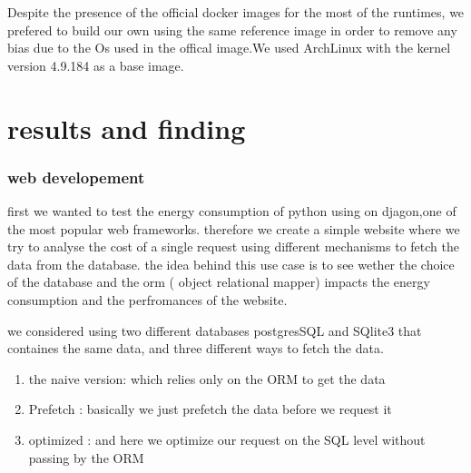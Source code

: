 Despite the presence of the official docker images for the most of the runtimes, we prefered to build our own using the same reference image in order to remove any bias due to the Os used in the offical image.We used ArchLinux with the kernel version 4.9.184 as a base image.
\section{results and finding}











\subsubsection{web developement}
first we wanted to test the energy consumption of python using on djagon,one of the most popular web frameworks.
therefore we create a simple website where we try to analyse the cost of a single request using different mechanisms to fetch the data from the database.
the idea behind this use case is to see wether the choice of the database and the orm ( object relational mapper) impacts the energy consumption and the perfromances of the website.

we considered using two different databases postgresSQL and SQlite3 that containes the same data, and three different ways to fetch the data.
\begin{enumerate}
    \item the naive version: which relies only on the ORM to get the data
    \item Prefetch : basically we just prefetch the data before we request it
    \item optimized : and here we optimize our request on the SQL level without passing by the ORM
\end{enumerate}

